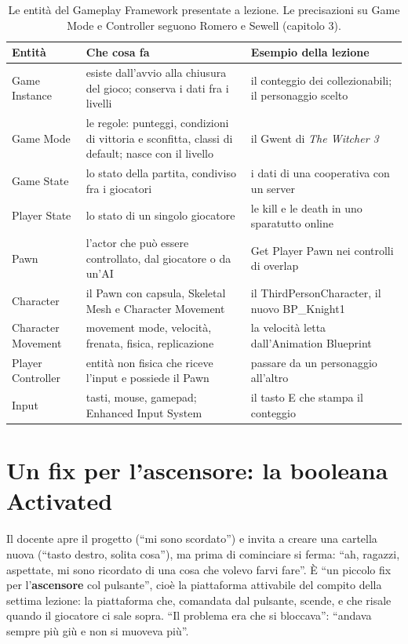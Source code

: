 \begin{table}[htbp]
\centering
\small
\begin{tabular}{@{}p{3.0cm}p{5.6cm}p{5.4cm}@{}}
\toprule
\textbf{Entità} & \textbf{Che cosa fa} & \textbf{Esempio della lezione} \\
\midrule
Game Instance & esiste dall'avvio alla chiusura del gioco; conserva i dati fra i
livelli & il conteggio dei collezionabili; il personaggio scelto \\
Game Mode & le regole: punteggi, condizioni di vittoria e sconfitta, classi di default;
nasce con il livello & il Gwent di \emph{The Witcher 3} \\
Game State & lo stato della partita, condiviso fra i giocatori & i dati di una
cooperativa con un server \\
Player State & lo stato di un singolo giocatore & le kill e le death in uno sparatutto
online \\
Pawn & l'actor che può essere controllato, dal giocatore o da un'AI & Get Player Pawn
nei controlli di overlap \\
Character & il Pawn con capsula, Skeletal Mesh e Character Movement & il
ThirdPersonCharacter, il nuovo BP\_Knight1 \\
Character Movement & movement mode, velocità, frenata, fisica, replicazione & la
velocità letta dall'Animation Blueprint \\
Player Controller & entità non fisica che riceve l'input e possiede il Pawn & passare
da un personaggio all'altro \\
Input & tasti, mouse, gamepad; Enhanced Input System & il tasto E che stampa il
conteggio \\
\bottomrule
\end{tabular}
\caption{Le entità del Gameplay Framework presentate a lezione. Le precisazioni su Game
Mode e Controller seguono Romero e Sewell (capitolo 3).}
\label{ue8:tab:framework}
\end{table}

\section{Un fix per l'ascensore: la booleana Activated}
\label{ue8:sec:ascensore}

Il docente apre il progetto (``mi sono scordato'') e invita a creare una cartella nuova
(``tasto destro, solita cosa''), ma prima di cominciare si ferma: ``ah, ragazzi,
aspettate, mi sono ricordato di una cosa che volevo farvi fare''. È ``un piccolo fix per
l'\textbf{ascensore} col pulsante'', cioè la piattaforma attivabile del compito della
settima lezione: la piattaforma che, comandata dal pulsante, scende, e che risale quando
il giocatore ci sale sopra. ``Il problema era che si bloccava'': ``andava sempre più giù
e non si muoveva più''.

